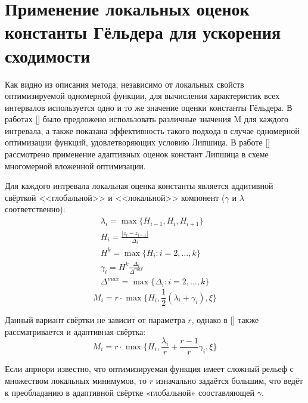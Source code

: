 \section{Применение локальных оценок константы Гёльдера для ускорения сходимости}
Как видно из описания метода, независимо от локальных свойств оптимизируемой одномерной
функции, для вычисления характеристик всех интервалов используется одно и то же
значение оценки константы Гёльдера. В работах [] было предложено использовать различные
значения M для каждого интревала, а также показана эффективность такого подхода в
случае одномерной оптимизации функций, удовлетворяющих условию Липшица. В работе []
рассмотрено применение адаптивных оценок констант Липшица в схеме многомерной вложенной оптимизации.

Для каждого интревала локальная оценка константы является аддитивной свёрткой
<<глобальной>> и <<локальной>> компонент (\(\gamma\) и \(\lambda\) соответственно):
\begin{displaymath}
  \begin{array}{lr}
    \lambda_i=\max\{H_{i-1},H_i,H_{i+1}\} \\
    H_i=\frac{|z_i-z_{i-1}|}{\Delta_i} \\
    H^k=\max\{H_i:i=2,\dots ,k\} \\
    \gamma_i=H^k\frac{\Delta_i}{\Delta^{max}} \\
    \Delta^{max}=\max\{\Delta_{i}:i=2,\dots ,k\}
  \end{array}
\end{displaymath}
\begin{equation}
\label{additiveConv}
M_i=r\cdot \max\{H_i, \frac{1}{2}(\lambda_i+\gamma_i),\xi\}
\end{equation}

Данный вариант свёртки не зависит от параметра \(r\), однако в [] также рассматривается
и адаптивная свёртка:
\begin{equation}
\label{additiveAdaptiveConv}
M_i=r\cdot \max\{H_i, \frac{\lambda_i}{r}+\frac{r-1}{r}\gamma_i,\xi\}
\end{equation}

Если априори известно, что оптимизируемая функция имеет сложный рельеф с множеством
локальных минимумов, то \(r\) изначально задаётся большим, что ведёт к преобладанию в
адаптивной свёртке «глобальной» сооставляющей \(\gamma\).

